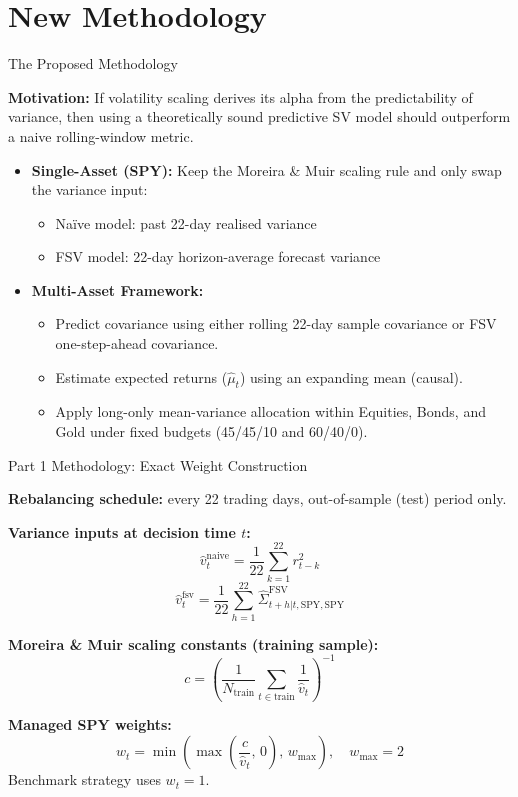 \documentclass[10pt]{beamer}\usepackage[]{graphicx}\usepackage[table]{xcolor}
\begin{document}
\section{New Methodology}
\begin{frame}{The Proposed Methodology}

  \textbf{Motivation:} If volatility scaling derives its alpha from the predictability of variance, then using a theoretically sound predictive SV model should outperform a naive rolling-window metric.

  \vspace{0.5em}

  \begin{itemize}
    \setlength\itemsep{0.8em}
    \item \textbf{Single-Asset (SPY):} Keep the Moreira \& Muir scaling rule and only swap the variance input:
      \begin{itemize}
        \item Na\"ive model: past 22-day realised variance
        \item FSV model: 22-day horizon-average forecast variance
      \end{itemize}
    \item \textbf{Multi-Asset Framework:} 
      \begin{itemize}
        \item Predict covariance using either rolling 22-day sample covariance or FSV one-step-ahead covariance.
        \item Estimate expected returns ($\hat{\mu}_{t}$) using an expanding mean (causal).
        \item Apply long-only mean-variance allocation within Equities, Bonds, and Gold under fixed budgets (45/45/10 and 60/40/0).
      \end{itemize}
  \end{itemize}

\end{frame}

\begin{frame}{Part 1 Methodology: Exact Weight Construction}

  \textbf{Rebalancing schedule:} every 22 trading days, out-of-sample (test) period only.

  \vspace{0.5em}
  \textbf{Variance inputs at decision time $t$:}
  \[
    \hat{v}^{\text{naive}}_t = \frac{1}{22}\sum_{k=1}^{22} r^2_{t-k}
  \]
  \[
    \hat{v}^{\text{fsv}}_t = \frac{1}{22}\sum_{h=1}^{22}\hat{\Sigma}^{\text{FSV}}_{t+h|t,\text{SPY},\text{SPY}}
  \]

  \vspace{0.5em}
  \textbf{Moreira \& Muir scaling constants (training sample):}
  \[
    c = \left(\frac{1}{N_{\text{train}}}\sum_{t \in \text{train}} \frac{1}{\hat{v}_t}\right)^{-1}
  \]

  \vspace{0.5em}
  \textbf{Managed SPY weights:}
  \[
    w_t = \min\!\left(\max\!\left(\frac{c}{\hat{v}_t},\,0\right),\,w_{\max}\right), \quad w_{\max}=2
  \]
  Benchmark strategy uses $w_t=1$.

\end{frame}
\end{document}
